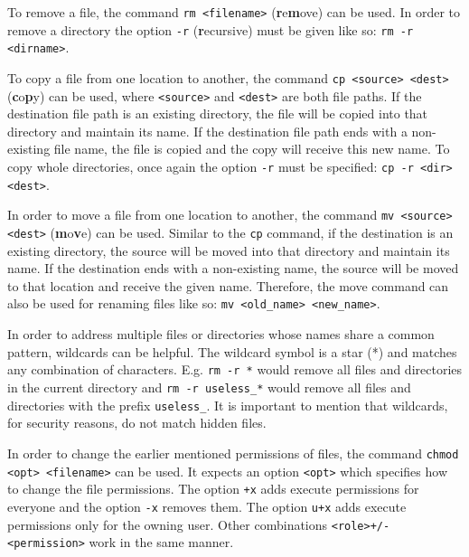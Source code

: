 To remove a file, the command \lstinline{rm <filename>} (\textbf{r}e\textbf{m}ove) can be used. In order to remove a directory the option \lstinline{-r} (\textbf{r}ecursive) must be given like so: \lstinline{rm -r <dirname>}.

To copy a file from one location to another, the command \lstinline{cp <source> <dest>} (\textbf{c}o\textbf{p}y) can be used, where \lstinline{<source>} and \lstinline{<dest>} are both file paths. If the destination file path is an existing directory, the file will be copied into that directory and maintain its name. If the destination file path ends with a non-existing file name, the file is copied and the copy will receive this new name. To copy whole directories, once again the option \lstinline{-r} must be specified: \lstinline{cp -r <dir> <dest>}.

In order to move a file from one location to another, the command \lstinline{mv <source> <dest>} (\textbf{m}o\textbf{v}e) can be used. Similar to the \lstinline{cp} command, if the destination is an existing directory, the source will be moved into that directory and maintain its name. If the destination ends with a non-existing name, the source will be moved to that location and receive the given name. Therefore, the move command can also be used for renaming files like so: \lstinline{mv <old_name> <new_name>}.

In order to address multiple files or directories whose names share a common pattern, wildcards can be helpful. The wildcard symbol is a star (*) and matches any combination of characters. E.g. \lstinline{rm -r *} would remove all files and directories in the current directory and \lstinline{rm -r useless_*} would remove all files and directories with the prefix \lstinline{useless_}. It is important to mention that wildcards, for security reasons, do not match hidden files.

In order to change the earlier mentioned permissions of files, the command \lstinline{chmod <opt> <filename>} can be used. It expects an option \lstinline{<opt>} which specifies how to change the file permissions. The option \lstinline{+x} adds execute permissions for everyone and the option \lstinline{-x} removes them. The option \lstinline{u+x} adds execute permissions only for the owning user. Other combinations \lstinline{<role>+/-<permission>} work in the same manner.

